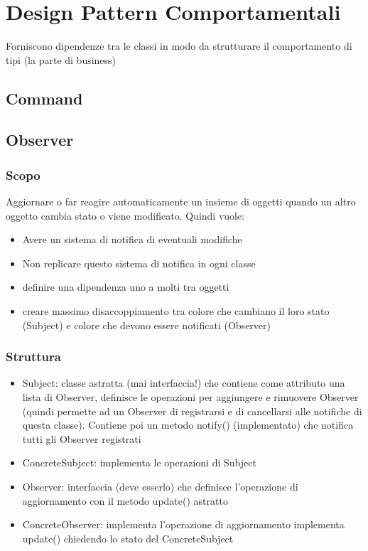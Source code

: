 \section{Design Pattern Comportamentali}
Forniscono dipendenze tra le classi in modo da strutturare il comportamento di tipi (la parte di business)

\subsection{Command}

\subsection{Observer}
\subsubsection{Scopo}
Aggiornare o far reagire automaticamente un insieme di oggetti quando un altro oggetto cambia stato o viene modificato. Quindi vuole:
\begin{itemize}
    \item Avere un sistema di notifica di eventuali modifiche
    \item Non replicare questo sistema di notifica in ogni classe
    \item definire una dipendenza uno a molti tra oggetti
    \item creare massimo disaccoppiamento tra colore che cambiano il loro stato (Subject) e colore che devono essere notificati (Observer)
\end{itemize}
\subsubsection{Struttura}
\begin{itemize}
    \item Subject: classe astratta (mai interfaccia!) che contiene come attributo una lista di Observer, definisce le operazioni per aggiungere e rimuovere Observer (quindi permette ad un Observer di registrarsi e di cancellarsi alle notifiche di questa classe). Contiene poi un metodo notify() (implementato) che notifica tutti gli Observer registrati
    \item ConcreteSubject: implementa le operazioni di Subject
    \item Observer: interfaccia (deve esserlo) che definisce l'operazione di aggiornamento con il metodo update() astratto
    \item ConcreteObserver: implementa l'operazione di aggiornamento implementa update() chiedendo lo stato del ConcreteSubject
\end{itemize}
